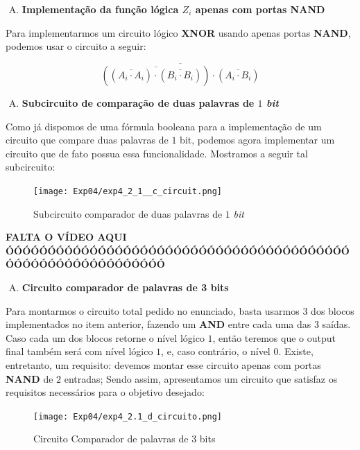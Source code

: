 \documentclass[12pt]{article}
\begin{document}
\begin{enumerate}[B)]
\item \textbf{Implementação da função lógica $Z_{i}$ apenas com portas NAND}
\end{enumerate}

Para implementarmos um circuito lógico \textbf{XNOR} usando apenas portas
\textbf{NAND}, podemos usar o circuito a seguir:

\begin{equation}
\overline{\left( \overline{(\overline{A_{i} \cdot A_{i}}) \cdot (\overline{B_{i} \cdot B_{i}})} \right) \cdot (\overline{A_{i} \cdot B_{i}})}
\end{equation}

\begin{enumerate}[C)]
\item \textbf{Subcircuito de comparação de duas palavras de $1$ \emph{bit}}
\end{enumerate}

Como já dispomos de uma fórmula booleana para a implementação de um circuito que
compare duas palavras de $1$ bit, podemos agora implementar um circuito que de
fato possua essa funcionalidade. Mostramos a seguir tal subcircuito:

\begin{figure}[H]
    \centering
    \texttt{[image: Exp04/exp4\_2\_1\_\_c\_circuit.png]}
    \caption{Subcircuito comparador de duas palavras de $1$ \emph{bit}}\label{fig:exp4_2_1__c_circuit.png}
\end{figure}

\textbf{FALTA O VÍDEO AQUI ÓÓÓÓÓÓÓÓÓÓÓÓÓÓÓÓÓÓÓÓÓÓÓÓÓÓÓÓÓÓÓÓÓÓÓÓÓÓÓÓÓÓÓÓÓÓÓÓÓÓÓÓÓÓÓÓÓÓÓÓ}

\begin{enumerate}[D)]
\item \textbf{Circuito comparador de palavras de 3 bits}
\end{enumerate}

Para montarmos o circuito total pedido no enunciado, basta usarmos $3$ dos
blocos implementados no item anterior, fazendo um \textbf{AND} entre cada uma
das $3$ saídas. Caso cada um dos blocos retorne o nível lógico $1$, então
teremos que o output final também será com nível lógico $1$, e, caso contrário,
o nível $0$. Existe, entretanto, um requisito: devemos montar esse circuito
apenas com portas \textbf{NAND} de $2$ entradas; Sendo assim, apresentamos um
circuito que satisfaz os requisitos necessários para o objetivo desejado:

\begin{figure}[H]
    \centering
    \texttt{[image: Exp04/exp4\_2.1\_d\_circuito.png]}
    \caption{Circuito Comparador de palavras de 3 bits}\label{fig:exp4_2.1_d_circuito.png}
\end{figure}
\end{document}
